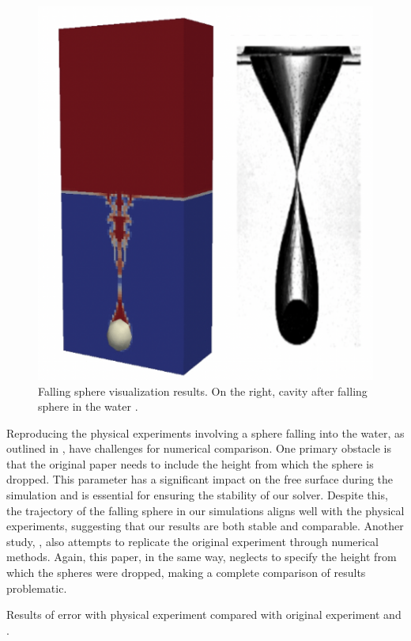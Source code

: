  \begin{figure}[!ht]
    \centering
    \includegraphics[width=12cm]{Images/chap4/cavityIB.png}
    \caption{Falling sphere visualization results. On the right, cavity after falling sphere in the water \cite{schwalbach}.}
    \label{fig:IB}
\end{figure}
Reproducing the physical experiments involving a sphere falling into the water, as outlined in \cite{schwalbach}, have challenges for numerical comparison. One primary obstacle is that the original paper needs to include the height from which the sphere is dropped. This parameter has a significant impact on the free surface during the simulation and is essential for ensuring the stability of our solver. Despite this, the trajectory of the falling sphere in our simulations aligns well with the physical experiments, suggesting that our results are both stable and comparable. Another study, \cite{shen2022resolved}, also attempts to replicate the original experiment through numerical methods. Again, this paper, in the same way, neglects to specify the height from which the spheres were dropped, making a complete comparison of results problematic.

Results of error with physical experiment compared with original experiment \cite{beck1987transient} and \cite{pathak20163d}.


